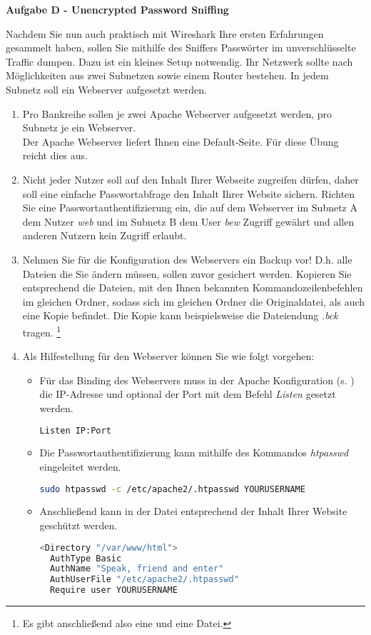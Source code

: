 \documentclass[paper=a4,fontsize=11pt]{scrartcl}%
\numberwithin{equation}{section}
\begin{document}
\begin{center}
\Large{\textbf{Aufgabe D - Unencrypted Password Sniffing}}
\end{center}\vskip0.25in
Nachdem Sie nun auch praktisch mit Wireshark Ihre ersten Erfahrungen gesammelt haben, sollen Sie mithilfe des Sniffers Passwörter im unverschlüsselte Traffic \glqq dumpen\grqq. Dazu ist ein kleines Setup notwendig. Ihr Netzwerk sollte nach Möglichkeiten aus zwei Subnetzen sowie einem Router bestehen. In jedem Subnetz soll ein Webserver aufgesetzt werden.
\begin{enumerate}
	\item Pro Bankreihe sollen je zwei Apache Webserver aufgesetzt werden, pro Subnetz je ein Webserver.\\
	Der Apache Webserver liefert Ihnen eine Default-Seite. Für diese Übung reicht dies aus.
	\item Nicht jeder Nutzer soll auf den Inhalt Ihrer Webseite zugreifen dürfen, daher soll eine einfache Passwortabfrage den Inhalt Ihrer Website sichern. Richten Sie eine Passwortauthentifizierung ein, die auf dem Webserver im Subnetz A dem Nutzer \emph{web} und im Subnetz B dem User \emph{bew} Zugriff gewährt und allen anderen Nutzern kein Zugriff erlaubt. 
	\item Nehmen Sie für die Konfiguration des Webservers ein Backup vor! D.h. alle Dateien die Sie ändern müssen, sollen zuvor gesichert werden. Kopieren Sie entsprechend die Dateien, mit den Ihnen bekannten Kommandozeilenbefehlen im gleichen Ordner, sodass sich im gleichen Ordner die Originaldatei, als auch eine Kopie befindet. Die Kopie kann beispielsweise die Dateiendung \emph{.bck} tragen. \footnote{Es gibt anschließend also eine  und eine  Datei.}
	\item Als Hilfestellung für den Webserver können Sie wie folgt vorgehen:
	\begin{itemize}
	\item Für das Binding des Webservers muss in der Apache Konfiguration (s. ) die IP-Adresse und optional der Port mit dem Befehl \emph{Listen} gesetzt werden. 
	\begin{lstlisting}[style=Bash, language=Bash]
Listen IP:Port 
\end{lstlisting} \label{apache}
	\item Die Passwortauthentifizierung kann mithilfe des Kommandos \emph{htpasswd} eingeleitet werden.
\begin{lstlisting}[style=Bash, language=Bash]
sudo htpasswd -c /etc/apache2/.htpasswd YOURUSERNAME
\end{lstlisting} \label{htpasswd}
	\item Anschließend kann in der Datei  entsprechend der Inhalt Ihrer Website geschützt werden.
\begin{lstlisting}[style=Bash, language=Bash]
<Directory "/var/www/html">
  AuthType Basic
  AuthName "Speak, friend and enter"
  AuthUserFile "/etc/apache2/.htpasswd"
  Require user YOURUSERNAME


\end{lstlisting}
\end{itemize}
\end{enumerate}
\end{document}
